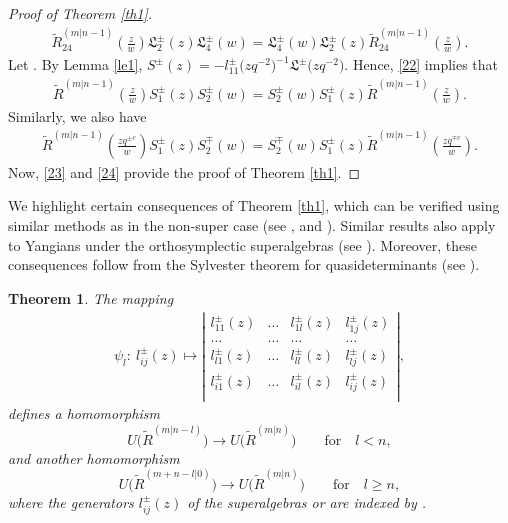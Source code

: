 \documentclass[10pt,a4paper]{amsart}
\numberwithin{equation}{section}
\newtheorem{Theorem}{Theorem}[section]
\begin{document}
\begin{proof}[Proof of Theorem \ref{th1}]
\begin{gather}
 \widetilde{R}_{24}^{(m|n-1)}\left(\frac{z}{w}\right) \mathfrak{L}_2^{\pm}(z)\mathfrak{L}_4^{\pm}(w)=\mathfrak{L}_4^{\pm}(w)\mathfrak{L}_2^{\pm}(z)\widetilde{R}_{24}^{(m|n-1)}\left(\frac{z}{w}\right).
\end{gather}
Let
.
By Lemma \ref{le1},
$S^{\pm}(z)=-l_{11}^{\pm}\bigl(zq^{-2}\bigr)^{-1}\mathfrak{L}^{\pm}\bigl(zq^{-2}\bigr)$.
Hence, \eqref{22} implies that
\begin{gather}\label{23}
 \widetilde{R}^{(m|n-1)}\left(\frac{z}{w}\right) S_1^{\pm}(z)S_2^{\pm}(w)=S_2^{\pm}(w)S_1^{\pm}(z) \widetilde{R}^{(m|n-1)}\left(\frac{z}{w}\right).
\end{gather}
Similarly, we also have
\begin{gather}\label{24}
 \widetilde{R}^{(m|n-1)}\left(\frac{zq^{\pm c}}{w}\right) S_1^{\pm}(z)S_2^{\mp}(w)=S_2^{\mp}(w)S_1^{\pm}(z) \widetilde{R}^{(m|n-1)}\left(\frac{zq^{\mp c}}{w}\right).
\end{gather}
Now, \eqref{23} and \eqref{24} provide the proof of Theorem \ref{th1}.
\end{proof}

We highlight certain consequences of Theorem \ref{th1}, which can be verified using similar methods as in the non-super case (see \cite[Theorem 3.9]{JMA}, and \cite[Theorem 3.7]{JMAB}). Similar results also apply to Yangians under the orthosymplectic superalgebras (see \cite[Corollary 3.2]{AIM}). Moreover, these consequences follow from the Sylvester theorem for quasideterminants (see \cite{IMG,DKBM}).

\begin{Theorem}\label{th2}
The mapping
\begin{align}\label{25}
\psi_l\colon\ l_{ij}^{\pm}(z)\mapsto
\left|
 \begin{matrix}
 l_{11}^{\pm}(z) & \ldots & l_{1l}^{\pm}(z) & l_{1j}^{\pm}(z) \\
 \ldots & \ldots & \ldots & \ldots \\
 l_{l1}^{\pm}(z) & \ldots & l_{ll}^{\pm}(z) & l_{lj}^{\pm}(z) \\
 l_{i1}^{\pm}(z) & \ldots & l_{il}^{\pm}(z) & \boxed{l_{ij}^{\pm}(z)} \\
 \end{matrix}
\right|,
\end{align}defines a homomorphism
\begin{equation*}
 U\bigl(\widetilde{R}^{(m|n-l)}\bigr)\rightarrow U\bigl(\widetilde{R}^{(m|n)}\bigr)\qquad \text{for} \quad l<n,
\end{equation*}and another homomorphism
\begin{equation*}
 U\bigl(\widetilde{R}^{(m+n-l|0)}\bigr)\rightarrow U\bigl(\widetilde{R}^{(m|n)}\bigr)\qquad \text{for} \quad l\geq n,
\end{equation*}
where the generators $l_{ij}^{\pm}(z)$ of the superalgebras  or  are indexed by .
\end{Theorem}
\end{document}
